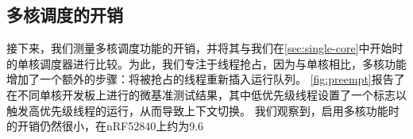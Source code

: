 \subsection{多核调度的开销}




接下来，我们测量多核调度功能的开销，并将其与我们在\autoref{sec:single-core}中开始时的单核调度器进行比较。为此，我们专注于线程抢占，因为与单核相比，多核功能增加了一个额外的步骤：将被抢占的线程重新插入运行队列。%
\autoref{fig:preempt}报告了在不同单核开发板上进行的微基准测试结果，其中低优先级线程设置了一个标志以触发高优先级线程的运行，从而导致上下文切换。
我们观察到，启用多核功能时的开销仍然很小，在nRF52840上约为9.6%

